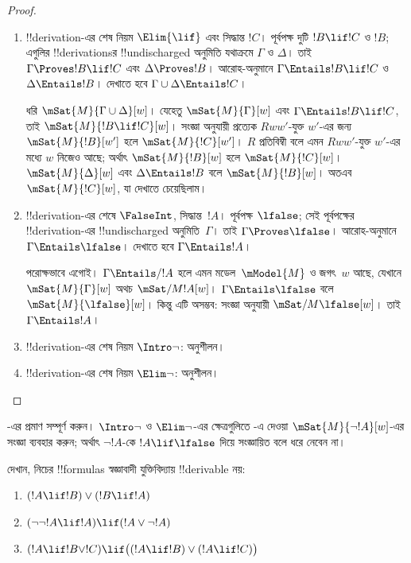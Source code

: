 \documentclass[../../../include/open-logic-section]{subfiles}
\begin{document}
\begin{proof}
\begin{enumerate}
  \item !!{derivation}-এর শেষ নিয়ম $\Elim{\lif}$ এবং সিদ্ধান্ত
    $!C$। পূর্বপক্ষ দুটি $!B \lif !C$ ও $!B$; এগুলির
    !!{derivation}sর !!{undischarged} অনুমিতি যথাক্রমে
    $\Gamma$ ও $\Delta$। তাই $\Gamma \Proves !B \lif !C$
    এবং $\Delta \Proves !B$। আরোহ-অনুমানে
    $\Gamma \Entails !B \lif !C$ ও $\Delta \Entails !B$।
    দেখাতে হবে $\Gamma \cup \Delta \Entails !C$।

    ধরি $\mSat{M}{\Gamma \cup \Delta}[w]$। যেহেতু
    $\mSat{M}{\Gamma}[w]$ এবং
    $\Gamma \Entails !B \lif !C$, তাই
    $\mSat{M}{!B \lif !C}[w]$। সংজ্ঞা অনুযায়ী প্রত্যেক
    $Rww'$-যুক্ত $w'$-এর জন্য $\mSat{M}{!B}[w']$ হলে
    $\mSat{M}{!C}[w']$। $R$ প্রতিবিম্বী বলে এমন $Rww'$-যুক্ত $w'$-এর
    মধ্যে $w$ নিজেও আছে; অর্থাৎ $\mSat{M}{!B}[w]$ হলে
    $\mSat{M}{!C}[w]$। $\mSat{M}{\Delta}[w]$ এবং
    $\Delta \Entails !B$ বলে $\mSat{M}{!B}[w]$। অতএব
    $\mSat{M}{!C}[w]$, যা দেখাতে চেয়েছিলাম।

  \item !!{derivation}-এর শেষে $\FalseInt$, সিদ্ধান্ত~$!A$।
    পূর্বপক্ষ $\lfalse$; সেই পূর্বপক্ষের !!{derivation}-এর
    !!{undischarged} অনুমিতি~$\Gamma$। তাই
    $\Gamma \Proves \lfalse$। আরোহ-অনুমানে
    $\Gamma \Entails \lfalse$। দেখাতে হবে
    $\Gamma \Entails !A$।

    পরোক্ষভাবে এগোই। $\Gamma \Entails/ !A$ হলে এমন
    মডেল~$\mModel{M}$ ও জগৎ~$w$ আছে, যেখানে
    $\mSat{M}{\Gamma}[w]$ অথচ $\mSat/{M}{!A}[w]$।
    $\Gamma \Entails \lfalse$ বলে $\mSat{M}{\lfalse}[w]$।
    কিন্তু এটি অসম্ভব: সংজ্ঞা অনুযায়ী
    $\mSat/{M}{\lfalse}[w]$। তাই $\Gamma \Entails !A$।
  \item !!{derivation}-এর শেষ নিয়ম $\Intro\lnot$: অনুশীলন।
  \item !!{derivation}-এর শেষ নিয়ম $\Elim\lnot$: অনুশীলন।
  \end{enumerate}
\end{proof}

\begin{prob}
  -এর প্রমাণ সম্পূর্ণ করুন।
  $\Intro\lnot$ ও $\Elim\lnot$-এর ক্ষেত্রগুলিতে
  -এ দেওয়া
  $\mSat{M}{\lnot !A}[w]$-এর সংজ্ঞা ব্যবহার করুন; অর্থাৎ
  $\lnot !A$-কে $!A \lif \lfalse$ দিয়ে সংজ্ঞায়িত বলে ধরে
  নেবেন না।
\end{prob}

\begin{prob}
  দেখান, নিচের !!{formula}s স্বজ্ঞাবাদী যুক্তিবিদ্যায়
  !!{derivable} নয়:
  \begin{enumerate}
    \item $(!A \lif !B) \lor (!B \lif !A)$
    \item $(\lnot\lnot !A \lif !A) \lif (!A \lor \lnot !A)$
    \item $(!A \lif !B \lor !C) \lif \bigl((!A \lif !B)\lor(!A \lif !C)\bigr)$
  \end{enumerate}
\end{prob}
\end{document}
